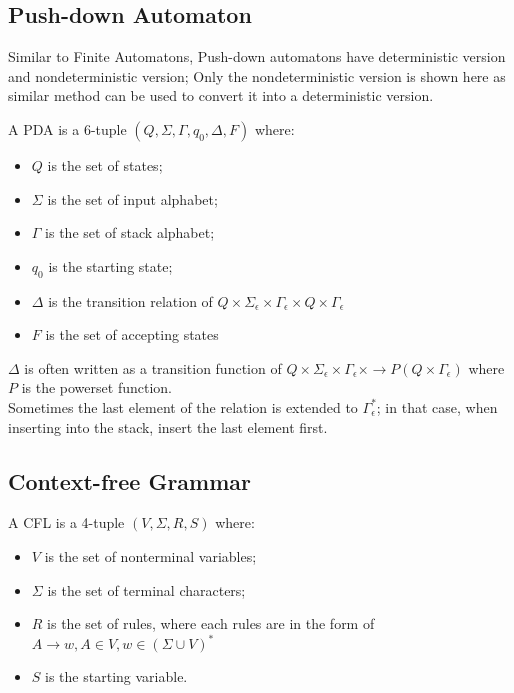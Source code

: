 \documentclass{report}
\begin{document}
		\subsection{Push-down Automaton}
			Similar to Finite Automatons, Push-down automatons have deterministic version and nondeterministic version; Only the nondeterministic version is shown here as similar method can be used to convert it into a deterministic version.
			\begin{defn} \label{def_pda}
				A PDA is a 6-tuple $(Q,\Sigma,\Gamma,q_0,\Delta,F)$ where:
				\begin{itemize}
					\item $Q$ is the set of states;
					\item $\Sigma$ is the set of input alphabet;
					\item $\Gamma$ is the set of stack alphabet;
					\item $q_0$ is the starting state;
					\item $\Delta$ is the transition relation of $Q \times \Sigma_\epsilon \times \Gamma_\epsilon \times Q \times \Gamma_\epsilon$
					\item $F$ is the set of accepting states
				\end{itemize}
				$\Delta$ is often written as a transition function of $Q \times \Sigma_\epsilon \times \Gamma_\epsilon \times \rightarrow P(Q \times \Gamma_\epsilon)$ where $P$ is the powerset function.\\
				Sometimes the last element of the relation is extended to $\Gamma_\epsilon^*$; in that case, when inserting into the stack, insert the last element first.
			\end{defn}
		
		\subsection{Context-free Grammar}
			\begin{defn} \label{def_cfl}
				A CFL is a 4-tuple $(V,\Sigma,R,S)$ where:
				\begin{itemize}
					\item $V$ is the set of nonterminal variables;
					\item $\Sigma$ is the set of terminal characters;
					\item $R$ is the set of rules, where each rules are in the form of $A\rightarrow w, A\in V, w\in (\Sigma \cup V)^*$
					\item $S$ is the starting variable.
				\end{itemize}
			\end{defn}
\end{document}
